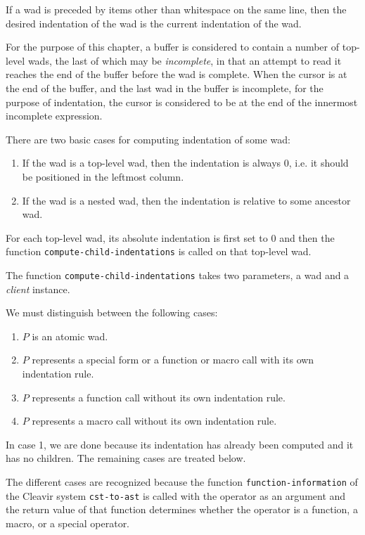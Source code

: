 If a wad is preceded by items other than whitespace on the same line,
then the desired indentation of the wad is the current indentation of
the wad.

For the purpose of this chapter, a buffer is considered to contain a
number of top-level wads, the last of which may be \emph{incomplete},
in that an attempt to read it reaches the end of the buffer before the
wad is complete.  When the cursor is at the end of the buffer, and the
last wad in the buffer is incomplete, for the purpose of indentation,
the cursor is considered to be at the end of the innermost incomplete
expression.

There are two basic cases for computing indentation of some wad:

\begin{enumerate}
\item If the wad is a top-level wad, then the
  indentation is always $0$, i.e. it should be positioned in the
  leftmost column.
\item If the wad is a nested wad, then the
  indentation is relative to some ancestor wad.
\end{enumerate}

For each top-level wad, its absolute indentation is first set
to $0$ and then the function \texttt{compute-child-indentations} is
called on that top-level wad.

The function \texttt{compute-child-indentations} takes two parameters,
a wad and a \emph{client} instance.

We must distinguish between the following cases:

\begin{enumerate}
\item $P$ is an atomic wad.
\item $P$ represents a special form or a function or macro call with
  its own indentation rule.
\item $P$ represents a function call without its own indentation rule.
\item $P$ represents a macro call without its own indentation rule.
\end{enumerate}

In case 1, we are done because its indentation has already been
computed and it has no children.  The remaining cases are treated
below.

The different cases are recognized because the function
\texttt{function-information} of the Cleavir system
\texttt{cst-to-ast} is called with the operator as an argument and the
return value of that function determines whether the operator is a
function, a macro, or a special operator.

